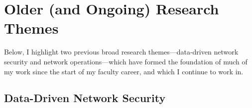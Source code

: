 \documentclass{article}
\begin{document}



\section*{Older (and Ongoing) Research Themes}

Below, I highlight two previous broad research themes---data-driven
network security and network operations---which have formed the
foundation of much of my work since the start of my faculty career, and
which I continue to work in.

\subsection*{Data-Driven Network Security}
\end{document}
